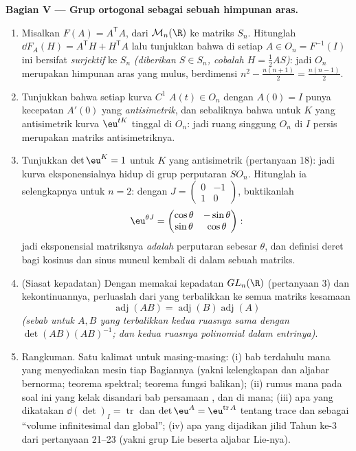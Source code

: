\begin{problem}
\medskip
\noindent\textbf{Bagian V --- Grup ortogonal sebagai sebuah himpunan
aras.}
\begin{enumerate}[resume]
  \item Misalkan $F(A) = A^{\mathsf T}A$, dari $\mathcal M_n(\R)$ ke
        matriks  $S_n$. Hitunglah $\dd F_A(H) =
        A^{\mathsf T}H + H^{\mathsf T}A$ lalu tunjukkan bahwa di setiap
        $A \in O_n = F^{-1}(I)$  ini bersifat
        \emph{surjektif} ke $S_n$ \emph{(diberikan $S \in S_n$,
        cobalah $H = \frac12 AS$)}: jadi $O_n$ merupakan himpunan aras yang mulus,
        berdimensi $n^2 - \frac{n(n+1)}2 = \frac{n(n-1)}2$.
  \item Tunjukkan bahwa setiap kurva $C^1$ $A(t) \in O_n$ dengan $A(0) =
        I$ punya kecepatan $A'(0)$ yang \emph{antisimetrik}, dan
        sebaliknya bahwa untuk $K$ yang antisimetrik kurva
        $\eu^{tK}$ tinggal di $O_n$: jadi ruang singgung $O_n$
        di $I$ persis merupakan matriks antisimetriknya.
  \item Tunjukkan $\det\eu^{K} = 1$ untuk $K$ yang antisimetrik (pertanyaan
        18): jadi kurva eksponensialnya hidup di grup perputaran
        $SO_n$. Hitunglah ia selengkapnya untuk $n = 2$: dengan $J =
        \begin{pmatrix}0 & -1\\ 1 & 0\end{pmatrix}$, buktikanlah
        \[
        \eu^{\theta J} = \begin{pmatrix} \cos\theta &
        -\sin\theta\\ \sin\theta & \cos\theta\end{pmatrix} :
        \]
        jadi eksponensial matriksnya \emph{adalah} perputaran sebesar
        $\theta$, dan definisi deret bagi kosinus dan sinus
        muncul kembali di dalam sebuah matriks.
  \item (Siasat kepadatan) Dengan memakai kepadatan $GL_n(\R)$
        (pertanyaan 3) dan kekontinuannya, perluaslah dari yang terbalikkan ke
        semua matriks kesamaan
        \[
        \operatorname{adj}(AB) =
        \operatorname{adj}(B)\operatorname{adj}(A)
        \]
        \emph{(sebab untuk $A, B$ yang terbalikkan kedua ruasnya sama dengan
        $\det(AB)(AB)^{-1}$; dan kedua ruasnya polinomial dalam
        entrinya)}.
  \item Rangkuman. Satu kalimat untuk masing-masing: (i) bab
        terdahulu mana yang menyediakan mesin tiap Bagiannya
        (yakni kelengkapan dan aljabar bernorma; teorema
        spektral; teorema fungsi balikan); (ii) rumus mana
        pada soal ini yang kelak disandari bab persamaan
        , dan di mana; (iii) apa yang dikatakan
        $\dd(\det)_I = \operatorname{tr}$ dan $\det\eu^A =
        \eu^{\operatorname{tr}A}$ tentang trace dan
         sebagai ``volume infinitesimal dan global'';
        (iv) apa yang dijadikan jilid Tahun ke-3 dari pertanyaan
        21--23 (yakni grup Lie beserta aljabar Lie-nya).

\end{enumerate}
\end{problem}
